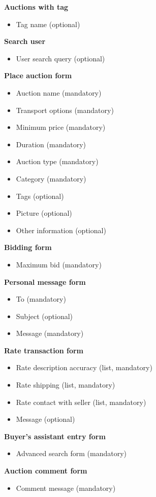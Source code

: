 	\textbf{Auctions with tag}
		\begin{itemize}
			\item Tag name (optional)
		\end{itemize}
	\textbf{Search user}
		\begin{itemize}
			\item User search query (optional)
		\end{itemize}
	\textbf{Place auction form}
		\begin{itemize}
			\item Auction name (mandatory)
			\item Transport options (mandatory)
			\item Minimum price (mandatory)
			\item Duration (mandatory)
			\item Auction type (mandatory)
			\item Category (mandatory)
			\item Tags (optional)
			\item Picture (optional)
			\item Other information (optional)
		\end{itemize}
	\textbf{Bidding form}
		\begin{itemize}
			\item Maximum bid (mandatory)
		\end{itemize}
	\textbf{Personal message form}
		\begin{itemize}
			\item To (mandatory)
			\item Subject (optional)
			\item Message (mandatory)
		\end{itemize}
	\textbf{Rate transaction form}
		\begin{itemize}
			\item Rate description accuracy (list, mandatory)
			\item Rate shipping (list, mandatory)
			\item Rate contact with seller (list, mandatory)
			\item Message (optional)
		\end{itemize}
	\textbf{Buyer's assistant entry form}
		\begin{itemize}
			\item Advanced search form (mandatory)
		\end{itemize}
	\textbf{Auction comment form}
		\begin{itemize}
			\item Comment message (mandatory)
		\end{itemize}
		
